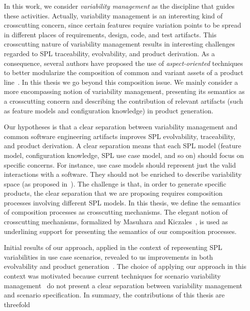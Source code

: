 \documentclass[times, 11pt,twocolumn]{article}
\begin{document}
In this work, we consider \emph{variability management} as the discipline that
guides these activities. Actually, variability management is an interesting kind
of crosscutting concern, since certain features require variation points to be
spread in different places of requirements, design, code, and test artifacts.
This crosscutting nature of variability management results in interesting
challenges regarded to SPL traceability, evolvability, and product derivation. As
a consequence, several authors have proposed the use of \emph{aspect-oriented}
techniques to better modularize the composition of common and variant assets of a
product line~\cite{}. In this thesis we go beyond this composition issue. We
mainly consider a more encompassing notion of variability management, presenting
its semantics as a crosscutting concern and describing the contribution of
relevant artifacts (such as feature models and configuration knowledge) in
product generation.

Our hypotheses is that a clear separation between variability management and
common software engineering artifacts improves SPL evolvability, traceability,
and product derivation. A clear separation means that each SPL model (feature
model, configuration knowledge, SPL use case model, and so on) should focus on
specific concerns. For instance, use case models should represent just the valid
interactions with a software. They should not be enriched to describe variability
space (as proposed in~\cite{Bertolino:2003aa}). The challenge is that, in order
to generate specific products, the clear separation that we are proposing
requires composition processes involving different SPL models. In this thesis,
we define the semantics of composition processes as crosscutting mechanisms.
The elegant notion of crosscutting mechanisms, formalized by Masuhara and
Kiczales~\cite{Masuhara:2003aa}, is used as underlining support for presenting
the semantics of our composition processes. 

Initial results of our approach, applied in the context of representing SPL
variabilities in use case scenarios, revealed to us improvements in both
evolvability and product generation~\cite{Bonifacio:2008aa}. The choice of applying our
approach in this context was motivated because current techniques for scenario variability
management~\cite{Eriksson:2005aa, Bertolino:2003aa} do not present a clear
separation between variability management and scenario specification.
In summary, the contributions of this thesis are threefold
\end{document}
